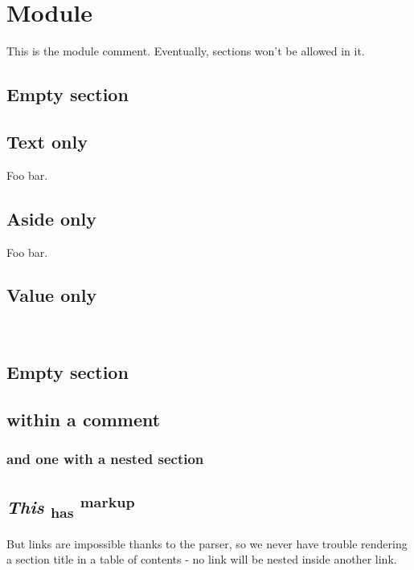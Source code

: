 \section{Module }\label{Section}%
This is the module comment. Eventually, sections won't be allowed in it.

\subsection{Empty section\label{Section-empty-section}}%
\subsection{Text only\label{Section-text-only}}%
Foo bar.

\subsection{Aside only\label{Section-aside-only}}%
Foo bar.

\subsection{Value only\label{Section-value-only}}%
\label{Section-val-foo}\\
\subsection{Empty section\label{Section-empty-section_2}}%
\subsection{within a comment\label{Section-within-a-comment}}%
\subsubsection{and one with a nested section\label{Section-and-one-with-a-nested-section}}%
\subsection{\emph{This}   \textsubscript{has} \textsuperscript{markup}\label{Section-this-section-title-has-markup}}%
But links are impossible thanks to the parser, so we never have trouble rendering a section title in a table of contents - no link will be nested inside another link.



